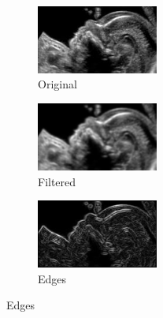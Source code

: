 \documentclass[a4paper,10pt,twocolumn]{article}
\begin{document}
\begin{center}
	\begin{figure}[!htb]
		\begin{subfigure}[a!]{4cm}
			\includegraphics[width=4cm]{image/im7/im_7}
			\caption{Original}
		\end{subfigure}
		\begin{subfigure}[b!]{4cm}
			\includegraphics[width=4cm]{image/im7/im_7_noise}
			\caption{Filtered}
		\end{subfigure}
		\begin{subfigure}[c!]{4cm}
			\includegraphics[width=4cm]{image/im7/im_7_edge}
			\caption{Edges}
		\end{subfigure}
		

\end{figure}
\end{center}
\end{document}

